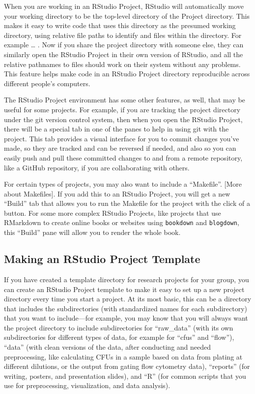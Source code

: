 \documentclass[]{tufte-book}
\begin{document}
When you are working in an RStudio Project, RStudio will automatically move your
working directory to be the top-level directory of the Project directory. This
makes it easy to write code that uses this directory as the presumed working
directory, using relative file paths to identify and files within the directory.
For example \ldots{} . Now if you share the project directory with someone else, they
can similarly open the RStudio Project in their own version of RStudio, and all
the relative pathnames to files should work on their system without any problems.
This feature helps make code in an RStudio Project directory reproducible across
different people's computers.

The RStudio Project environment has some other features, as well, that may be
useful for some projects. For example, if you are tracking the project directory
under the git version control system, then when you open the RStudio Project,
there will be a special tab in one of the panes to help in using git with the
project. This tab provides a visual interface for you to commit changes you've made,
so they are tracked and can be reversed if needed, and also so you can easily
push and pull these committed changes to and from a remote repository, like a
GitHub repository, if you are collaborating with others.

For certain types of projects, you may also want to include a ``Makefile''. {[}More
about Makefiles{]}. If you add this to an RStudio Project, you will get a new
``Build'' tab that allows you to run the Makefile for the project with the click of
a button. For some more complex RStudio Projects, like projects that use RMarkdown
to create online books or websites using \texttt{bookdown} and \texttt{blogdown}, this ``Build''
pane will allow you to render the whole book.

\hypertarget{making-an-rstudio-project-template}{%
\subsection{Making an RStudio Project Template}\label{making-an-rstudio-project-template}}

If you have created a template directory for research projects for your group,
you can create an RStudio Project template to make it easy to set up a new
project directory every time you start a project. At its most basic, this can be
a directory that includes the subdirectories (with standardized names for each
subdirectory) that you want to include---for example, you may know that you will
always want the project directory to include subdirectories for ``raw\_data'' (with
its own subdirectories for different types of data, for example for ``cfus'' and
``flow''), ``data'' (with clean versions of the data, after conducting and needed
preprocessing, like calculating CFUs in a sample based on data from plating at
different dilutions, or the output from gating flow cytometry data), ``reports''
(for writing, posters, and presentation slides), and ``R'' (for common scripts
that you use for preprocessing, visualization, and data analysis).
\end{document}
